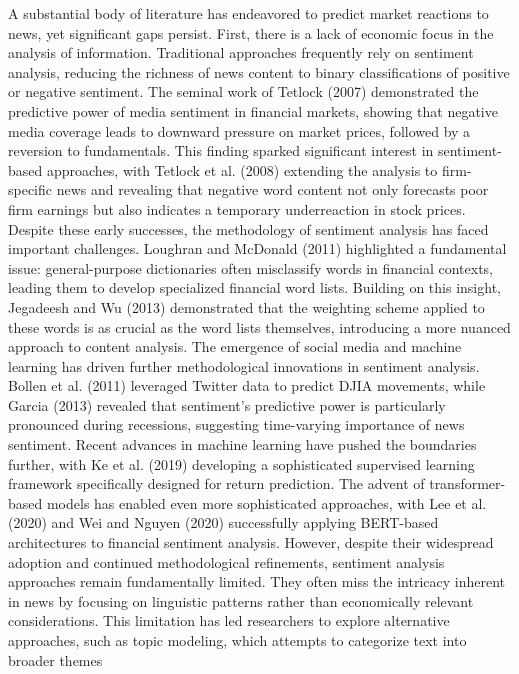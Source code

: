 A substantial body of literature has endeavored to predict market reactions to news, yet significant gaps persist. 
First, there is a lack of economic focus in the analysis of information. Traditional approaches frequently rely on sentiment analysis, reducing the richness of news content to binary classifications of positive or negative sentiment. The seminal work of Tetlock (2007) demonstrated the predictive power of media sentiment in financial markets, showing that negative media coverage leads to downward pressure on market prices, followed by a reversion to fundamentals. This finding sparked significant interest in sentiment-based approaches, with Tetlock et al. (2008) extending the analysis to firm-specific news and revealing that negative word content not only forecasts poor firm earnings but also indicates a temporary underreaction in stock prices.
Despite these early successes, the methodology of sentiment analysis has faced important challenges. Loughran and McDonald (2011) highlighted a fundamental issue: general-purpose dictionaries often misclassify words in financial contexts, leading them to develop specialized financial word lists. Building on this insight, Jegadeesh and Wu (2013) demonstrated that the weighting scheme applied to these words is as crucial as the word lists themselves, introducing a more nuanced approach to content analysis.
The emergence of social media and machine learning has driven further methodological innovations in sentiment analysis. Bollen et al. (2011) leveraged Twitter data to predict DJIA movements, while Garcia (2013) revealed that sentiment's predictive power is particularly pronounced during recessions, suggesting time-varying importance of news sentiment. Recent advances in machine learning have pushed the boundaries further, with Ke et al. (2019) developing a sophisticated supervised learning framework specifically designed for return prediction. The advent of transformer-based models has enabled even more sophisticated approaches, with Lee et al. (2020) and Wei and Nguyen (2020) successfully applying BERT-based architectures to financial sentiment analysis.
However, despite their widespread adoption and continued methodological refinements, sentiment analysis approaches remain fundamentally limited. They often miss the intricacy inherent in news by focusing on linguistic patterns rather than economically relevant considerations. This limitation has led researchers to explore alternative approaches, such as topic modeling, which attempts to categorize text into broader themes
